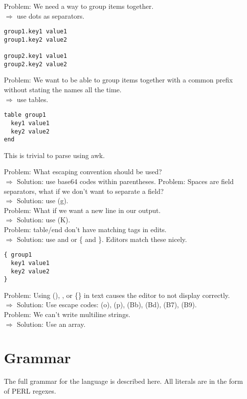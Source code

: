 \documentclass[listof=totoc]{article}
\begin{document}
\noindent Problem: We need a way to group items together. \\
$\Rightarrow$ use dots as separators.

\begin{verbatim}
group1.key1 value1
group1.key2 value2

group2.key1 value1
group2.key2 value2
\end{verbatim}

\noindent Problem: We want to be able to group items together with a common prefix without stating the names all the time. \\
$\Rightarrow$ use tables.

\begin{verbatim}
table group1
  key1 value1
  key2 value2
end
\end{verbatim}

\noindent This is trivial to parse using awk.

\noindent Problem: What escaping convention should be used? \\
$\Rightarrow$ Solution: use base64 codes within parentheses.
Problem: Spaces are field separators, what if we don't want to separate a field? \\
$\Rightarrow$ Solution: use (g). \\
Problem: What if we want a new line in our output. \\
$\Rightarrow$ Solution: use (K). \\
Problem: table/end don't have matching tags in edits. \\
$\Rightarrow$ Solution: use \lbrack and \rbrack or \{ and \}. Editors match these nicely.

\begin{verbatim}
{ group1
  key1 value1
  key2 value2
}
\end{verbatim}

\noindent Problem: Using (), \lbrack \rbrack, or \{\} in text causes the editor to not display correctly. \\
$\Rightarrow$ Solution: Use escape codes: (o), (p), (Bb), (Bd), (B7), (B9). \\
\noindent Problem: We can't write multiline strings. \\
$\Rightarrow$ Solution: Use an array.

\section{Grammar}
\noindent The full grammar for the language is described here. All literals are in the form of PERL regexes.
\end{document}
